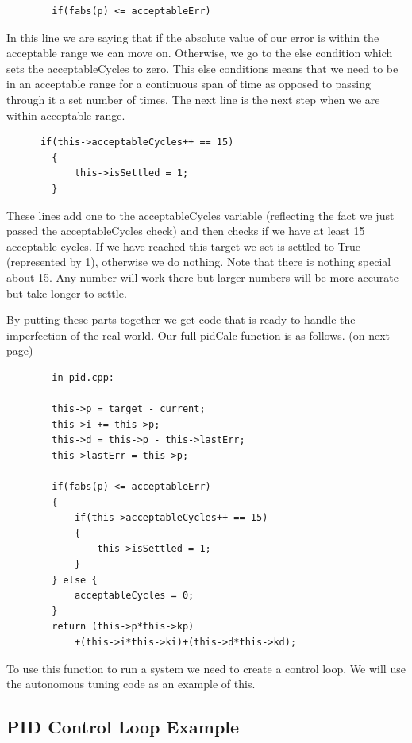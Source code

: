 \documentclass[12pt]{article}
\begin{document}
    \begin{verbatim}
        if(fabs(p) <= acceptableErr)
    \end{verbatim}

    In this line we are saying that if the absolute value of our error is within the acceptable range we can move on. Otherwise, we go to the else condition which sets the acceptableCycles to zero. This else conditions means that we need to be in an acceptable range for a continuous span of time as opposed to passing through it a set number of times. The next line is the next step when we are within acceptable range.

    \begin{verbatim}
      if(this->acceptableCycles++ == 15)
        {
            this->isSettled = 1;
        }
    \end{verbatim}

    These lines add one to the acceptableCycles variable (reflecting the fact we just passed the acceptableCycles check) and then checks if we have at least 15 acceptable cycles. If we have reached this target we set is settled to True (represented by 1), otherwise we do nothing. Note that there is nothing special about 15. Any number will work there but larger numbers will be more accurate but take longer to settle.

    By putting these parts together we get code that is ready to handle the imperfection of the real world. Our full pidCalc function is as follows. (on next page)

    \begin{verbatim}
        in pid.cpp:

        this->p = target - current;
        this->i += this->p;
        this->d = this->p - this->lastErr;
        this->lastErr = this->p;

        if(fabs(p) <= acceptableErr)
        {
            if(this->acceptableCycles++ == 15)
            {
                this->isSettled = 1;
            }
        } else {
            acceptableCycles = 0;
        }
        return (this->p*this->kp)
            +(this->i*this->ki)+(this->d*this->kd);
    \end{verbatim}

    To use this function to run a system we need to create a control loop. We will use the autonomous tuning code as an example of this.

\subsection{PID Control Loop Example}
\end{document}
